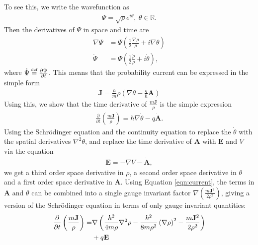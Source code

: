To see this, we write the wavefunction as
\begin{align}
    \Psi = \sqrt{\rho} e^{i \theta}, ~ \theta \in \mathbb{R}.
\end{align}
Then the derivatives of $\Psi$ in space and time are
\begin{align}
    \nabla \Psi &= \Psi \left( \frac{1}{2} \frac{\nabla
        \rho}{\rho} + i \nabla \theta \right) \\
    \dot \Psi &= \Psi \left( \frac{1}{2} \frac{\dot
        \rho}{\rho} + i \dot \theta \right),
\end{align}
where $\dot \Psi \defeq \dbydt{\Psi}$. This means that the probability current
can be expressed in the simple form
\begin{align}
    \mathbf{J} = \frac{\hbar}{m} \rho \left( \nabla \theta - \frac{q}{\hbar}
        \mathbf{A} \right)
    \label{eqn:current}
\end{align}
Using this, we show that the time derivative of $\frac{m \mathbf{J}}{\rho}$ is
the simple expression
\begin{align}
    \frac{\partial}{\partial t}\left(\frac{m \mathbf{J}}{\rho}\right)
        = \hbar \nabla \dot \theta - q\mathbf{\dot A}.
\end{align}
Using the Schr\"odinger equation and the continuity equation to replace the
$\dot \theta$ with the spatial derivatives $\nabla^2 \theta$, and replace the
time derivative of $\mathbf{A}$ with $\mathbf{E}$ and $V$ via the equation
\begin{align}
    \mathbf{E} = - \nabla V - \mathbf{\dot A},
\end{align}
we get a third order space derivative in $\rho$, a second order space derivative
in $\theta$ and a first order space derivative in $\mathbf{A}$. Using Equation
\ref{eqn:current}, the terms in $\mathbf{A}$ and $\theta$ can be combined into a
single gauge invariant factor $\nabla \left( \frac{m \mathbf{J}^2}{2 \rho^2}
\right)$, giving a version of the Schr\"odinger equation in terms of only gauge
invariant quantities:
\begin{align}
    \frac{\partial}{\partial t} \left( \frac{m \mathbf{J}}{\rho} \right)
    =& \nabla \left( \frac{\hbar^2}{4m\rho} \nabla^2 \rho -
       \frac{\hbar^2}{8m\rho^2} \left(\nabla \rho \right)^2 - \frac{m
       \mathbf{J}^2}{2 \rho^2} \right) \notag \\
    &  + q\mathbf{E}
    \label{eqn:gise}
\end{align}

